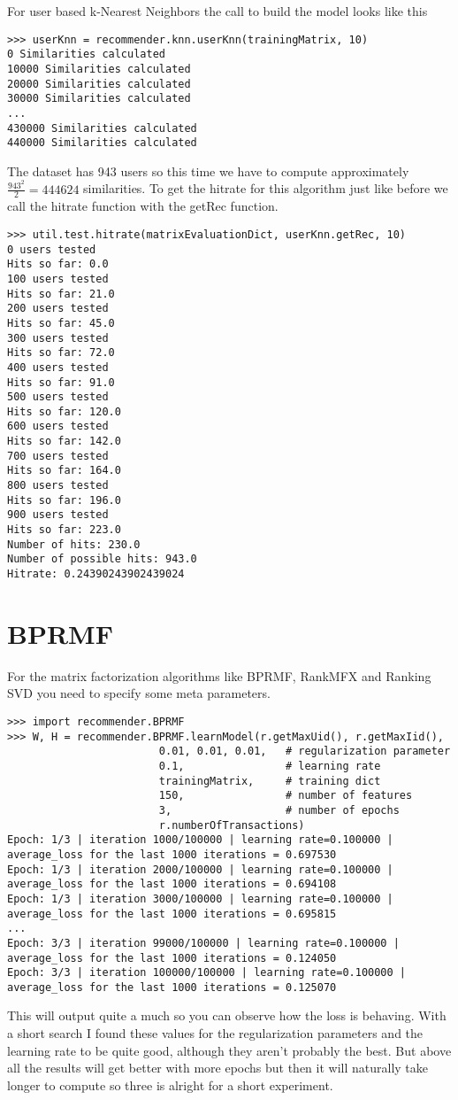 For user based k-Nearest Neighbors the call to build the model looks like this
\begin{lstlisting}
>>> userKnn = recommender.knn.userKnn(trainingMatrix, 10)
0 Similarities calculated
10000 Similarities calculated
20000 Similarities calculated
30000 Similarities calculated
...
430000 Similarities calculated
440000 Similarities calculated
\end{lstlisting}
The dataset has 943 users so this time we have to compute approximately
\begin{math} \frac{943^2}{2} = 444624 \end{math} similarities.
To get the hitrate for this algorithm just like before we call the hitrate
function with the getRec function.
\begin{lstlisting}
>>> util.test.hitrate(matrixEvaluationDict, userKnn.getRec, 10)
0 users tested
Hits so far: 0.0
100 users tested
Hits so far: 21.0
200 users tested
Hits so far: 45.0
300 users tested
Hits so far: 72.0
400 users tested
Hits so far: 91.0
500 users tested
Hits so far: 120.0
600 users tested
Hits so far: 142.0
700 users tested
Hits so far: 164.0
800 users tested
Hits so far: 196.0
900 users tested
Hits so far: 223.0
Number of hits: 230.0
Number of possible hits: 943.0
Hitrate: 0.24390243902439024
\end{lstlisting}

\section{BPRMF}
For the matrix factorization algorithms like BPRMF, RankMFX
and Ranking SVD you need to specify some meta parameters.
\begin{lstlisting}
>>> import recommender.BPRMF
>>> W, H = recommender.BPRMF.learnModel(r.getMaxUid(), r.getMaxIid(),
                        0.01, 0.01, 0.01,   # regularization parameter
                        0.1,                # learning rate
                        trainingMatrix,     # training dict
                        150,                # number of features
                        3,                  # number of epochs
                        r.numberOfTransactions)
Epoch: 1/3 | iteration 1000/100000 | learning rate=0.100000 | average_loss for the last 1000 iterations = 0.697530
Epoch: 1/3 | iteration 2000/100000 | learning rate=0.100000 | average_loss for the last 1000 iterations = 0.694108
Epoch: 1/3 | iteration 3000/100000 | learning rate=0.100000 | average_loss for the last 1000 iterations = 0.695815
...
Epoch: 3/3 | iteration 99000/100000 | learning rate=0.100000 | average_loss for the last 1000 iterations = 0.124050
Epoch: 3/3 | iteration 100000/100000 | learning rate=0.100000 | average_loss for the last 1000 iterations = 0.125070
\end{lstlisting}
This will output quite a much so you can observe how the loss is behaving.
With a short search I found these values for the regularization parameters
and the learning rate to be quite good, although they aren't probably the
best. But above all the results will get better with more epochs but then
it will naturally take longer to compute so three is alright for a short
experiment.

